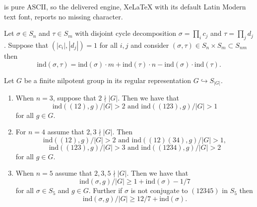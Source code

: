 \documentclass[10pt,a4paper]{amsart}
\newcommand{\ind}{\mathrm{ind}}
\begin{document}
is pure ASCII, so the delivered engine, XeLaTeX with its default Latin Modern text font, reports no missing character.
\begin{Lemma}\label{index_comp}
    Let $\sigma \in S_n$ and $\tau \in S_m$ with disjoint cycle decomposition $\sigma = \prod_i c_j$ and $\tau = \prod_j d_j$. Suppose that $(|c_i|,|d_j|)= 1$ for all $i,j$ and consider $(\sigma, \tau) \in S_{n}\times S_m \subset S_{nm}$ then
    \[
\ind(\sigma, \tau) = \ind(\sigma)\cdot m+ \ind(\tau)\cdot n- \ind(\sigma) \cdot \ind(\tau).
\]
\end{Lemma}

\begin{proposition}\label{ind(sigma, g) propn}
    Let $G$ be a finite nilpotent group in its regular representation $G\hookrightarrow S_{|G|}$.
    \begin{enumerate}
        \item\label{c1 ind(sigma, g) propn} When $n=3$, suppose that $2 \nmid |G|$. Then we have that \begin{equation}\label{ind(sigma, g) propn f1}
        \ind((12),g)/|G| > 2 \text{ and } \ind((123),g)/|G| > 1
        \end{equation}
        for all $g \in G$.
        \item\label{c2 ind(sigma, g) propn} For $n=4$ assume that $2,3 \nmid |G|$. Then \begin{equation}\label{ind(sigma, g) propn f2}
        \ind((12),g)/|G| > 2\text{ and } \ind((12)(34),g)/|G| > 1, 
        \end{equation}
        \begin{equation}\label{ind(sigma, g) propn f3}
        \ind((123),g)/|G| > 3\text{ and } \ind((1234),g)/|G| > 2
        \end{equation}
        for all $g \in G$.
        \item\label{c3 ind(sigma, g) propn} When $n=5$ assume that $2,3,5 \nmid |G|$. Then we have that \begin{equation}\label{ind(sigma, g) propn f4}
        \ind(\sigma,g)/|G| \geq 1 + \ind(\sigma)-1/7\end{equation} for all $\sigma \in S_5$ and $g \in G$. Further if $\sigma$ is not conjugate to $(12345)$ in $S_5$ then \begin{equation}\label{ind(sigma, g) propn f5}\ind(\sigma,g)/|G| \geq 12/7 + \ind(\sigma).\end{equation}
    \end{enumerate}
\end{proposition}
\end{document}
